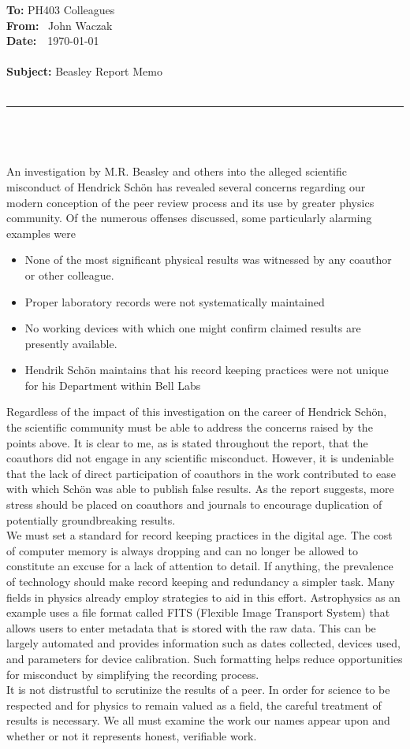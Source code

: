\documentclass[a4paper, 11pt]{article}
\begin{document}
\noindent
\large\textbf{To:} \qquad \qquad PH403 Colleagues \\
\large\textbf{From:} \qquad \, John Waczak \\
\large\textbf{Date:} \qquad \,\, \today \\ \\ 
\large\textbf{Subject:} \quad \; Beasley Report Memo \\ \\
\par\noindent\rule{\textwidth}{0.4pt} \\ \\ \\ 


An investigation by M.R. Beasley and others into the alleged scientific misconduct of Hendrick Sch\"{o}n has revealed several concerns regarding our modern conception of the peer review process and its use by greater physics community. Of the numerous offenses discussed, some particularly alarming examples were
\begin{itemize}
  \item None of the most significant physical results was witnessed by any coauthor or other colleague.
  \item Proper laboratory records were not systematically maintained
  \item No working devices with which one might confirm claimed results are presently available.
  \item Hendrik Schön maintains that his record keeping practices were not unique for his Department within Bell Labs
\end{itemize} 

Regardless of the impact of this investigation on the career of Hendrick Sch\"{o}n, the scientific community must be able to address the concerns raised by the points above. It is clear to me, as is stated throughout the report, that the coauthors did not engage in any scientific misconduct. However, it is undeniable that the lack of direct participation of coauthors in the work contributed to ease with which Sch\"{o}n was able to publish false results. As the report suggests, more stress should be placed on coauthors and journals to encourage duplication of potentially groundbreaking results. \\

We must set a standard for record keeping practices in the digital age. The cost of computer memory is always dropping and can no longer be allowed to constitute an excuse for a lack of attention to detail. If anything, the prevalence of technology should make record keeping and redundancy a simpler task. Many fields in physics already employ strategies to aid in this effort. Astrophysics as an example uses a file format called FITS (Flexible Image Transport System) that allows users to enter metadata that is stored with the raw data. This can be largely automated and provides information such as dates collected, devices used, and parameters for device calibration. Such formatting helps reduce opportunities for misconduct by simplifying the recording process. \\


It is not distrustful to scrutinize the results of a peer. In order for science to be respected and for physics to remain valued as a field, the careful treatment of results is necessary. We all must examine the work our names appear upon and whether or not it represents honest, verifiable work. 
\end{document}
